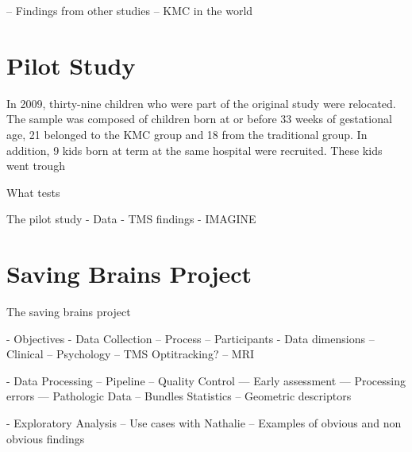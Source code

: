 
-- Findings from other studies
-- KMC in the world

\section{Pilot Study}

In 2009, thirty-nine children who were part of the original study were relocated. The sample was composed of children born at or before 33 weeks of gestational age, 21 belonged to the KMC group and 18 from the traditional group. In addition, 9 kids born at term at the same hospital were recruited. These kids went trough

What tests



The pilot study
 - Data
 - TMS findings
 - IMAGINE


\section{Saving Brains Project}

The saving brains project

 - Objectives
 - Data Collection
 -- Process
 -- Participants
 - Data dimensions
 -- Clinical
 -- Psychology
 -- TMS Optitracking?
 -- MRI
 
 - Data Processing
 -- Pipeline
 -- Quality Control
 --- Early assessment
 --- Processing errors
 --- Pathologic Data
 -- Bundles Statistics
 -- Geometric descriptors

 - Exploratory Analysis
 -- Use cases with Nathalie
 -- Examples of obvious and non obvious findings



